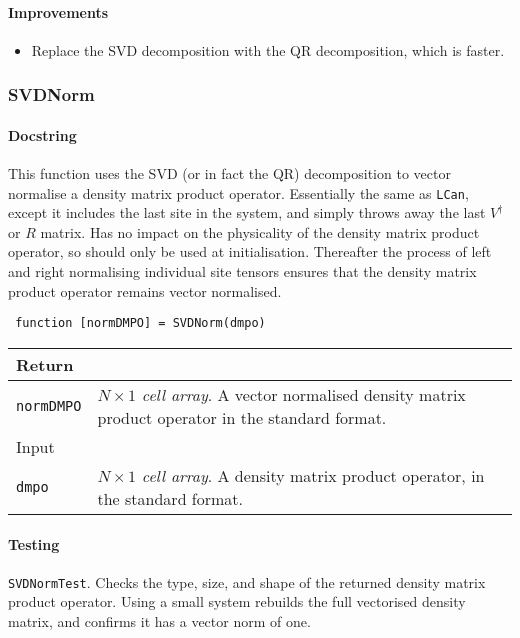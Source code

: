  \paragraph{Improvements}
 \begin{itemize}
 \item Replace the SVD decomposition with the QR decomposition, which is faster.
 \end{itemize}
 
 \subsubsection{SVDNorm}
 \paragraph{Docstring} This function uses the SVD (or in fact the QR) decomposition to vector normalise a density matrix product operator. Essentially the same as \lstinline$LCan$, except it includes the last site in the system, and simply throws away the last \(V^{\dagger}\) or \(R\) matrix. Has no impact on the physicality of the density matrix product operator, so should only be used at initialisation. Thereafter the process of left and right normalising individual site tensors ensures that the density matrix product operator remains vector normalised. 
 \begin{lstlisting}
 function [normDMPO] = SVDNorm(dmpo) \end{lstlisting}
 \begin{longtabu}{X[1,l]X[4,l]}
 \hline
 Return & \\ \hline
 \lstinline$normDMPO$ & \emph{\(N \times 1\) cell array}. A vector normalised density matrix product operator in the standard format. \\ \hline
 Input & \\ \hline
 \lstinline$dmpo$ & \emph{\(N \times 1\) cell array}. A density matrix product operator, in the standard format. \\ 
 \hline
 \end{longtabu}
 \paragraph{Testing} \lstinline$SVDNormTest$. Checks the type, size, and shape of the returned density matrix product operator. Using a small system rebuilds the full vectorised density matrix, and confirms it has a vector norm of one.  